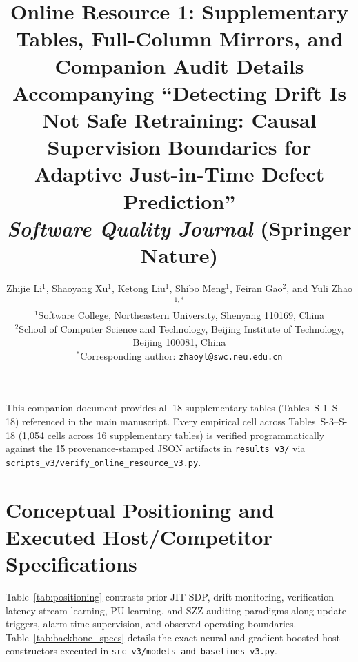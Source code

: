 \documentclass[10pt,a4paper]{article}
\title{\Large\textbf{Online Resource 1: Supplementary Tables, Full-Column Mirrors, and Companion Audit Details}\\[0.5em]
\large Accompanying ``Detecting Drift Is Not Safe Retraining: Causal Supervision Boundaries for Adaptive Just-in-Time Defect Prediction''\\[0.3em]
\normalsize\textit{Software Quality Journal} (Springer Nature)}
\author{Zhijie Li$^1$, Shaoyang Xu$^1$, Ketong Liu$^1$, Shibo Meng$^1$, Feiran Gao$^2$, and Yuli Zhao$^{1,*}$\\[0.3em]
\small $^1$Software College, Northeastern University, Shenyang 110169, China\\
\small $^2$School of Computer Science and Technology, Beijing Institute of Technology, Beijing 100081, China\\
\small $^*$Corresponding author: \texttt{zhaoyl@swc.neu.edu.cn}}
\date{}
\begin{document}
\maketitle

\noindent This companion document provides all 18 supplementary tables (Tables~S-1--S-18) referenced in the main manuscript. Every empirical cell across Tables~S-3--S-18 (1,054 cells across 16 supplementary tables) is verified programmatically against the 15 provenance-stamped JSON artifacts in \texttt{results\_v3/} via \texttt{scripts\_v3/\allowbreak verify\_\allowbreak online\_\allowbreak resource\_\allowbreak v3.py}.

\section{Conceptual Positioning and Executed Host/Competitor Specifications}
\label{sec:or_specs}

Table~\ref{tab:positioning} contrasts prior JIT-SDP, drift monitoring, verification-latency stream learning, PU learning, and SZZ auditing paradigms along update triggers, alarm-time supervision, and observed operating boundaries. Table~\ref{tab:backbone_specs} details the exact neural and gradient-boosted host constructors executed in \texttt{src\_v3/models\_and\_baselines\_v3.py}.
\end{document}
